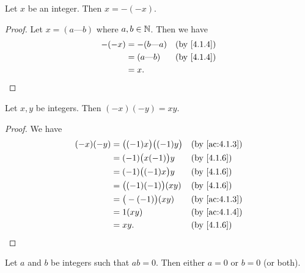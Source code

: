 \begin{ac}\label{ac:4.1.4}
  Let \(x\) be an integer.
  Then \(x = -(-x)\).
\end{ac}

\begin{proof}
  Let \(x = (a \text{---} b)\) where \(a, b \in \mathbb{N}\).
  Then we have
  \begin{align*}
    -(-x) & = -(b \text{---} a) &  & \by{4.1.4} \\
          & = (a \text{---} b)  &  & \by{4.1.4} \\
          & = x.
  \end{align*}
\end{proof}

\begin{ac}\label{ac:4.1.5}
  Let \(x, y\) be integers.
  Then \((-x)(-y) = xy\).
\end{ac}

\begin{proof}
  We have
  \begin{align*}
    (-x)(-y) & = \big((-1)x\big) \big((-1)y\big) &  & \text{(by \cref{ac:4.1.3})} \\
             & = (-1)\big(x(-1)\big)y            &  & \by{4.1.6}                  \\
             & = (-1)\big((-1)x\big)y            &  & \by{4.1.6}                  \\
             & = \big((-1)(-1)\big)(xy)          &  & \by{4.1.6}                  \\
             & = \big(-(-1)\big)(xy)             &  & \text{(by \cref{ac:4.1.3})} \\
             & = 1(xy)                           &  & \text{(by \cref{ac:4.1.4})} \\
             & = xy.                             &  & \by{4.1.6}
  \end{align*}
\end{proof}

\begin{prop}\label{4.1.8}
  Let \(a\) and \(b\) be integers such that \(ab = 0\).
  Then either \(a = 0\) or \(b = 0\) (or both).
\end{prop}

